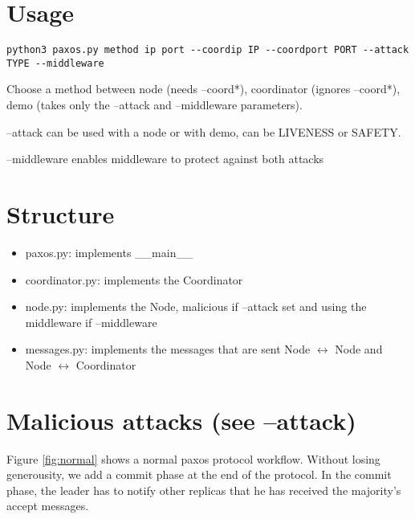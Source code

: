 \documentclass[12pt]{article}
\begin{document}
\section{Usage}

\begin{verbatim}
python3 paxos.py method ip port --coordip IP --coordport PORT --attack TYPE --middleware
\end{verbatim}

Choose a method between node (needs \textsf{--coord*}), coordinator (ignores \textsf{--coord*}), demo (takes only the \textsf{--attack} and \textsf{--middleware parameters}).

\textsf{--attack} can be used with a node or with demo, can be LIVENESS or SAFETY.

\textsf{--middleware} enables middleware to protect against both attacks


\section{Structure}

\begin{itemize}
    \item \textsf{paxos.py}: implements \textsf{\_\_main\_\_}
    \item \textsf{coordinator.py}: implements the Coordinator
    \item \textsf{node.py}: implements the Node, malicious if --attack set and using the middleware if \textsf{--middleware}
    \item \textsf{messages.py}: implements the messages that are sent Node $\leftrightarrow$ Node and Node $\leftrightarrow$ Coordinator
\end{itemize}


\section{Malicious attacks (see --attack)}

Figure \ref{fig:normal} shows a normal paxos protocol workflow. Without losing generousity, we add a commit phase at the end of the protocol. In the commit phase, the leader has to notify other replicas that he has received the majority's accept messages.
\end{document}
